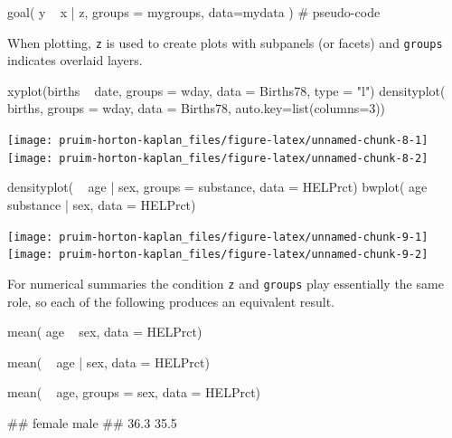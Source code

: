 \begin{Schunk}
\begin{Sinput}
goal( y ~ x | z, groups = mygroups, data=mydata )    # pseudo-code
\end{Sinput}
\end{Schunk}

\noindent
When plotting, \texttt{z} is used to create plots with subpanels (or
facets) and \texttt{groups} indicates overlaid layers.

\begin{Schunk}
\begin{Sinput}
xyplot(births ~ date, groups = wday, data = Births78, type = "l")
densityplot( ~ births, groups = wday, data = Births78, auto.key=list(columns=3))
\end{Sinput}


\begin{center}\texttt{[image: pruim-horton-kaplan\_files/figure-latex/unnamed-chunk-8-1]} \texttt{[image: pruim-horton-kaplan\_files/figure-latex/unnamed-chunk-8-2]} \end{center}

\end{Schunk}\begin{Schunk}
\begin{Sinput}
densityplot( ~ age | sex, groups = substance, data = HELPrct)
bwplot( age ~ substance | sex, data = HELPrct)
\end{Sinput}


\begin{center}\texttt{[image: pruim-horton-kaplan\_files/figure-latex/unnamed-chunk-9-1]} \texttt{[image: pruim-horton-kaplan\_files/figure-latex/unnamed-chunk-9-2]} \end{center}

\end{Schunk}

For numerical summaries the condition \texttt{z} and \texttt{groups}
play essentially the same role, so each of the following produces an
equivalent result.

\begin{Schunk}
\begin{Sinput}
mean( age ~ sex, data = HELPrct)
\end{Sinput}
\end{Schunk}\begin{Schunk}
\begin{Sinput}
mean( ~ age | sex, data = HELPrct)
\end{Sinput}
\end{Schunk}\begin{Schunk}
\begin{Sinput}
mean( ~ age, groups = sex, data = HELPrct)
\end{Sinput}
\begin{Soutput}
## female   male 
##   36.3   35.5
\end{Soutput}
\end{Schunk}

